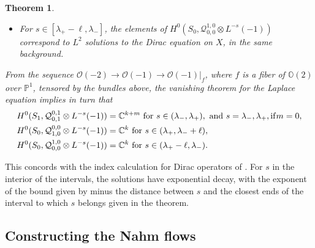 \documentclass[12pt]{article}
\newtheorem{theorem}{Theorem}[section]
\theoremstyle{definition}
\theoremstyle{remark}
\numberwithin{theorem}{section}
\def\bC{{\mathbb {C}}}
\def\bP{{\mathbb {P}}}
\def\bO{{\mathbb {O}}}
\def\pO{{\mathcal O}}
\def\pQ{{\mathcal Q}}
\begin{document}
\begin{theorem}
\begin{itemize}
  \item For $s\in [\lambda_+-\ell, \lambda_-  ]$, 
 the elements of $H^0(S_0, \pQ_{0,0}^{1,0}\otimes L^{-s}(-1))$ correspond to $L^2$ solutions to the Dirac equation on $X$, in the same background.
 \end{itemize}

  

 
 From the sequence $\pO(-2)\rightarrow \pO(-1)\rightarrow \pO(-1)|_f$, where $f$ is a fiber of $\bO(2)$ over $\bP^1$, tensored by the bundles above, the vanishing theorem for the Laplace equation implies in turn that 
 \begin{align}   H^0(S_1, \pQ_{0,1}^{0,1}\otimes L^{-s}(-1)) & =\bC^{k+m}\ {\rm for}\ s\in  (\lambda_-, \lambda_+),\ {\rm and}\ s= \lambda_-, \lambda_+, {\rm if} m=0,\\
H^0(S_0, \pQ_{1,0}^{0,0}\otimes L^{-s}(-1)) &= \bC^k  \ {\rm for}\ s\in (\lambda_+, \lambda_- +\ell),\\
 H^0(S_0, \pQ_{0,0}^{1,0}\otimes L^{-s}(-1))& = \bC^k \ {\rm for}\ s\in (\lambda_+-\ell, \lambda_-  ).
\end{align}
\end{theorem} 
 This concords with the index calculation for Dirac operators of \cite{Cherkis:2016gmo}. For $s$ in the interior of the intervals,   the solutions have exponential decay, with the exponent of the bound given by minus the distance between $s$ and the closest ends of the interval  to which $s$ belongs given in the theorem.  
 

\subsection{Constructing the Nahm flows} 
\end{document}
